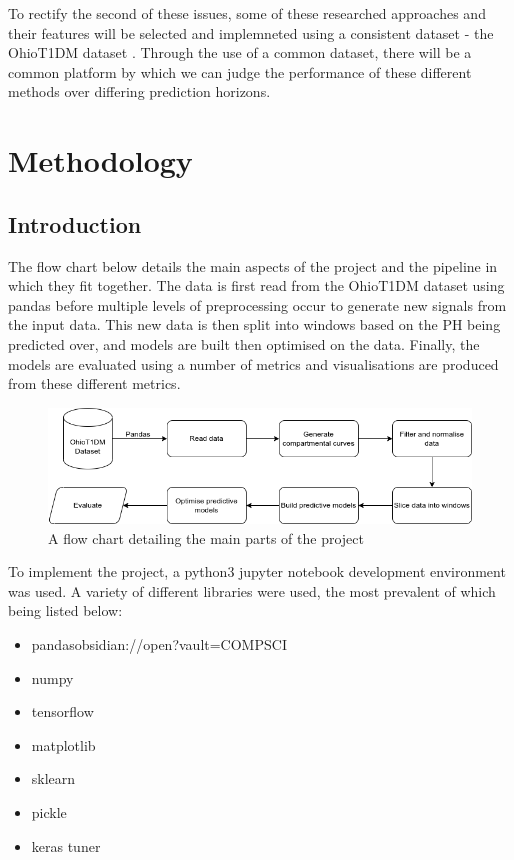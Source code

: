       To rectify the second of these issues, some of these researched approaches and their features will be selected and implemneted using a consistent dataset - the OhioT1DM dataset \cite{ohio}. Through the use of a common dataset, there will be a common platform by which we can judge the performance of these different methods over differing prediction horizons.

\section{Methodology} %
    \subsection{Introduction}
      
    The flow chart below details the main aspects of the project and the pipeline in which they fit together. The data is first read from the OhioT1DM dataset using pandas before multiple levels of preprocessing occur to generate new signals from the input data. This new data is then split into windows based on the PH being predicted over, and models are built then optimised on the data. Finally, the models are evaluated using a number of metrics and visualisations are produced from these different metrics.

    \begin{figure}[H]
      \centering
      \includegraphics[width=\textwidth]{images/codeflow.png} 
      \caption{
       A flow chart detailing the main parts of the project
      }
    \end{figure}

    To implement the project, a python3 jupyter notebook development environment was used. A variety of different libraries were used, the most prevalent of which being listed below:
    \begin{itemize}
      \item pandasobsidian://open?vault=COMPSCI%
      \item numpy
      \item tensorflow
      \item matplotlib
      \item sklearn
      \item pickle
      \item keras tuner
    \end{itemize}
  
